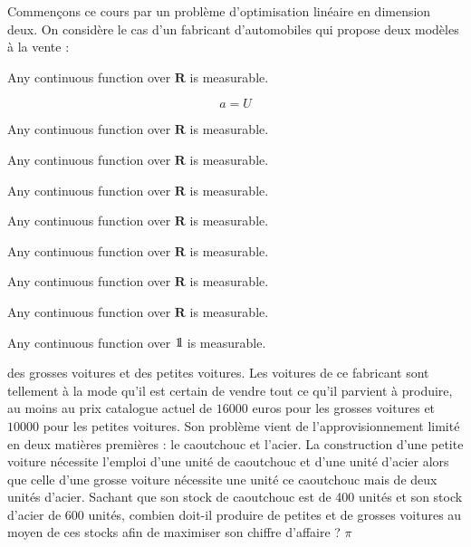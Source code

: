 \documentclass[a4paper, 11pt,openany]{book}%
\newtheorem[L]{thm}{Théorème}[section]
\newtheorem[M]{propo}[thm]{Proposition}
\newtheorem[M]{prop}[thm]{Propriété}
\newtheorem[M]{coro}[thm]{Corollaire}
\newtheorem[M]{lem}[thm]{Lemme}
\newtheorem[M,bodystyle=]{defi}[thm]{Définition}
\newtheorem[M,bodystyle=]{remark}[thm]{Remarque}
\newtheorem[M,bodystyle=]{met}[thm]{Méthode}
\newtheorem[M,bodystyle=]{ret}[thm]{A retenir}
\newtheorem[M,bodystyle=]{idee}[thm]{Idée}
\newtheorem[style=S,underline=false,bodystyle=]{exem}[thm]{Exemple}
\newtheorem[S,underline=false,bodystyle=]{exo}[thm]{Exercice}
\newtheorem[S,underline=false,bodystyle=]{appli}[thm]{Application}
\newtheorem[S,underline=false,bodystyle=]{sol}[thm]{Solution}
\newtheorem[S,underline=false,bodystyle=]{hypo}[thm]{Hypothesis}
\newtheorem[S,underline=false,bodystyle=]{nota}[thm]{Notation}
\def\un{{\mathchoice {\rm 1\mskip-4mu l} {\rm 1\mskip-4mu l}

{\rm 1\mskip-4.5mu l} {\rm 1\mskip-5mu l}}} %
\begin{document}
         

       

         

            Commençons ce cours par un problème d'optimisation linéaire en dimension deux. On considère le cas d'un fabricant d'automobiles qui propose deux modèles à la vente :

   \begin{thm}\label{thm1}

Any continuous function over $\mathbf{R}$ is measurable.

\[a=U\]

\end{thm} 





\begin{defi}



Any continuous function over $\mathbf{R}$ is measurable.

Any continuous function over $\mathbf{R}$ is measurable.

Any continuous function over $\mathbf{R}$ is measurable.

Any continuous function over $\mathbf{R}$ is measurable.

Any continuous function over $\mathbf{R}$ is measurable.

Any continuous function over $\mathbf{R}$ is measurable.

Any continuous function over $\mathbf{R}$ is measurable.

Any continuous function over $\un$ is measurable.

\end{defi}



        

             des grosses voitures et des petites voitures. Les voitures de ce fabricant sont tellement à la mode qu'il est certain de vendre tout ce qu'il parvient à produire, au moins au prix catalogue actuel de $16000$ euros pour les grosses voitures et $10000$ pour les petites voitures. Son problème vient de l'approvisionnement limité en deux matières premières : le caoutchouc et l'acier. La construction d'une petite voiture nécessite l'emploi d'une unité de caoutchouc et d'une unité d'acier alors que celle d'une grosse voiture nécessite une unité ce caoutchouc mais de deux unités d'acier. Sachant que son stock de caoutchouc est de 400 unités et son stock d'acier de 600 unités, combien doit-il produire de petites et de grosses voitures au moyen de ces stocks afin de maximiser son chiffre d'affaire ? $\pi$
\end{document}
